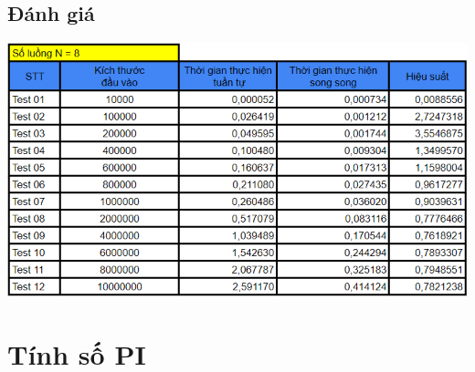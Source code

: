 \documentclass[12pt,a4paper]{report}
\begin{document}
\section{Đánh giá}
\begin{center}
	\includegraphics[scale=0.9]{./Photos/Fibonacci/Benchmark.PNG}
\end{center}


\chapter{Tính số PI}
\end{document}
